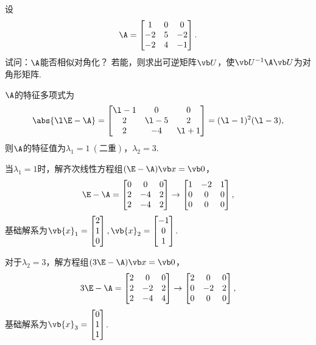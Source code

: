 \begin{example}
设\[
	\A = \begin{bmatrix}
		1 & 0 & 0 \\
		-2 & 5 & -2 \\
		-2 & 4 & -1
	\end{bmatrix}.
\]
试问：\(\A\)能否相似对角化？
若能，则求出可逆矩阵\(\P\)，使\(\P^{-1}\A\P\)为对角形矩阵.
\begin{solution}
\(\A\)的特征多项式为\[
	\abs{\l\E-\A} = \begin{bmatrix}
		\l-1 & 0 & 0 \\
		2 & \l-5 & 2 \\
		2 & -4 & \l+1
	\end{bmatrix}
	= (\l-1)^2 (\l-3),
\]
则\(\A\)的特征值为\(\lambda_1=1\ (\text{二重})\)，\(\lambda_2=3\).

当\(\lambda_1=1\)时，解齐次线性方程组\((\E-\A)\x=\vb0\)，\[
	\E-\A=\begin{bmatrix}
		0 & 0 & 0 \\
		2 & -4 & 2 \\
		2 & -4 & 2
	\end{bmatrix}
	\to \begin{bmatrix}
		1 & -2 & 1 \\
		0 & 0 & 0 \\
		0 & 0 & 0
	\end{bmatrix},
\]
基础解系为\(\vb{x}_1 = \begin{bmatrix} 2 \\ 1 \\ 0 \end{bmatrix},
\vb{x}_2 = \begin{bmatrix} -1 \\ 0 \\ 1 \end{bmatrix}\).

对于\(\lambda_2=3\)，解方程组\((3\E-\A)\x=\vb0\)，\[
	3\E-\A=\begin{bmatrix}
		2 & 0 & 0 \\
		2 & -2 & 2 \\
		2 & -4 & 4
	\end{bmatrix} \to \begin{bmatrix}
		2 & 0 & 0 \\
		0 & -2 & 2 \\
		0 & 0 & 0
	\end{bmatrix},
\]
基础解系为\(\vb{x}_3 = \begin{bmatrix} 0 \\ 1 \\ 1 \end{bmatrix}\).


\end{solution}
\end{example}
